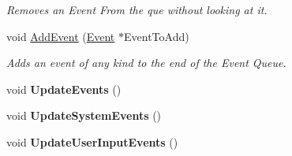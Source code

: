\begin{DoxyCompactItemize}
\begin{DoxyCompactList}\small\item\em Removes an Event From the que without looking at it. \item\end{DoxyCompactList}\item 
void \hyperlink{classPhysEventManager_a6f51657b66d214942aed0e832ee558ef}{AddEvent} (\hyperlink{classphys_1_1Event}{Event} $\ast$EventToAdd)
\begin{DoxyCompactList}\small\item\em Adds an event of any kind to the end of the Event Queue. \item\end{DoxyCompactList}\item 
\hypertarget{classPhysEventManager_a34b4b8d35fee0f593fbb32b83843abba}{
void {\bfseries UpdateEvents} ()}
\label{d5/dd7/classPhysEventManager_a34b4b8d35fee0f593fbb32b83843abba}

\item 
\hypertarget{classPhysEventManager_adcdeb687464f00252e1c4052d4b9304e}{
void {\bfseries UpdateSystemEvents} ()}
\label{d5/dd7/classPhysEventManager_adcdeb687464f00252e1c4052d4b9304e}

\item 
\hypertarget{classPhysEventManager_a99f2350628caf751e156107d57646030}{
void {\bfseries UpdateUserInputEvents} ()}
\label{d5/dd7/classPhysEventManager_a99f2350628caf751e156107d57646030}


\end{DoxyCompactItemize}

